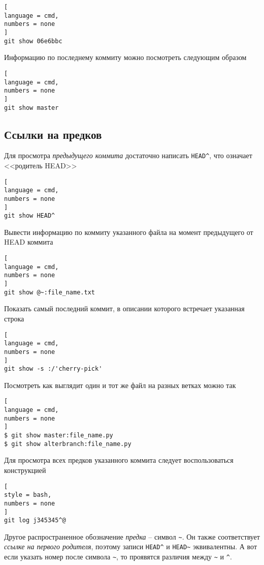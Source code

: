 \documentclass[%
	11pt,
	a4paper,
	utf8,
		]{article}
\begin{document}
\begin{lstlisting}[
language = cmd,
numbers = none
]
git show 06e6bbc
\end{lstlisting}

Информацию по последнему коммиту можно посмотреть следующим образом

\begin{lstlisting}[
language = cmd,
numbers = none
]
git show master
\end{lstlisting}

\subsection{Ссылки на предков}

Для просмотра \emph{предыдущего коммита} достаточно написать \texttt{HEAD\^}, что означает <<родитель HEAD>>

\begin{lstlisting}[
language = cmd,
numbers = none
]
git show HEAD^
\end{lstlisting}

Вывести информацию по коммиту указанного файла на момент предыдущего от HEAD коммита
\begin{lstlisting}[
language = cmd,
numbers = none
]
git show @~:file_name.txt
\end{lstlisting}

Показать самый последний коммит, в описании которого встречает указанная строка
\begin{lstlisting}[
language = cmd,
numbers = none
]
git show -s :/'cherry-pick'
\end{lstlisting}

Посмотреть как выглядит один и тот же файл на разных ветках можно так
\begin{lstlisting}[
language = cmd,
numbers = none
]
$ git show master:file_name.py
$ git show alterbranch:file_name.py
\end{lstlisting}

Для просмотра всех предков указанного коммита следует воспользоваться конструкцией
\begin{lstlisting}[
style = bash,
numbers = none
]
git log j345345^@
\end{lstlisting}


Другое распространенное обозначение \emph{предка} -- символ \lstinline{~}. Он также соответствует \emph{ссылке на первого родителя}, поэтому записи \lstinline{HEAD^} и \lstinline{HEAD~} эквивалентны. А вот если указать номер после символа \lstinline{~}, то проявятся различия между \lstinline{~} и \lstinline{^}.
\end{document}

